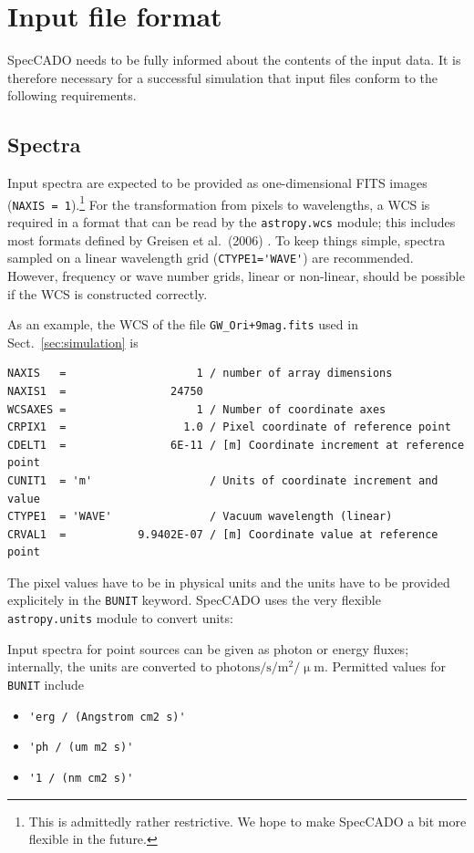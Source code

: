 \documentclass[a4paper,twoside,11pt]{article}
\newcommand{\micron}{\upmu\mathrm{m}}
\begin{document}
\section{Input file format}
\label{sec:input_format}

SpecCADO needs to be fully informed about the contents of the input
data. It is therefore necessary for a successful simulation that input
files conform to the following requirements.

\subsection{Spectra}
\label{ssec:input_spectra}

Input spectra are expected to be provided as one-dimensional FITS
images (\lstinline{NAXIS = 1}).\footnote{This is admittedly rather
  restrictive. We hope to make SpecCADO a bit more flexible in the
  future.}  For the transformation from pixels to wavelengths, a WCS
is required in a format that can be read by the
\lstinline{astropy.wcs} module; this includes most formats defined by
Greisen et al.\ (2006) \cite{Greisen2006}. To keep things simple,
spectra sampled on a linear wavelength grid
(\lstinline{CTYPE1='WAVE'}) are recommended. However, frequency or
wave number grids, linear or non-linear, should be possible if the WCS
is constructed correctly.

As an example, the WCS of the file \lstinline{GW_Ori+9mag.fits} used
in Sect.~\ref{sec:simulation} is
\begin{lstlisting}
NAXIS   =                    1 / number of array dimensions
NAXIS1  =                24750
WCSAXES =                    1 / Number of coordinate axes
CRPIX1  =                  1.0 / Pixel coordinate of reference point
CDELT1  =                6E-11 / [m] Coordinate increment at reference point
CUNIT1  = 'm'                  / Units of coordinate increment and value
CTYPE1  = 'WAVE'               / Vacuum wavelength (linear)
CRVAL1  =           9.9402E-07 / [m] Coordinate value at reference point
\end{lstlisting}

The pixel values have to be in physical units and the units have to be
provided explicitely in the \lstinline{BUNIT} keyword. SpecCADO uses
the very flexible \lstinline{astropy.units} module to convert units:

Input spectra for point sources can be given as photon or energy
fluxes; internally, the units are converted to
$\mathrm{photons}/\mathrm{s}/\mathrm{m^{2}}/\micron$.  Permitted
values for \lstinline{BUNIT} include
\begin{itemize}
\item \lstinline{'erg / (Angstrom cm2 s)'}
\item \lstinline{'ph / (um m2 s)'}
\item \lstinline{'1 / (nm cm2 s)'}
\end{itemize}
\end{document}
